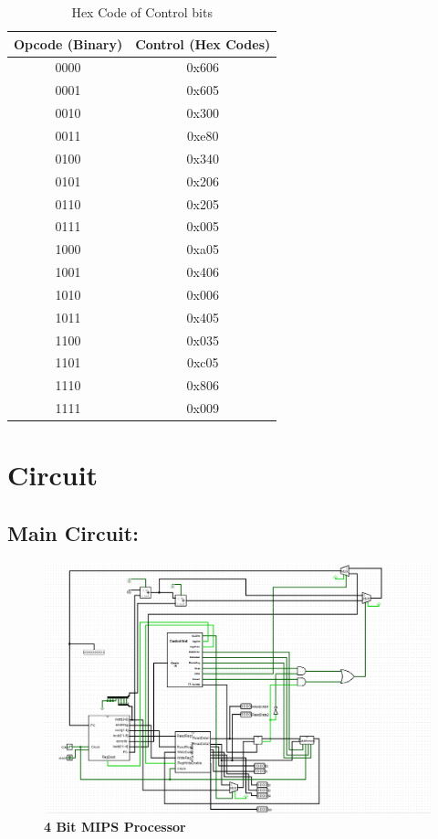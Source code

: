 \documentclass{article}
\begin{document}
\begin{table}[!h]
    \centering
    \begin{tabular}{|c|c|}
        \hline
        \textbf{Opcode (Binary)} & \textbf{Control (Hex Codes)} \\
        \hline
        0000 & 0x606 \\ \hline
        0001 & 0x605 \\ \hline
        0010 & 0x300 \\ \hline
        0011 & 0xe80 \\ \hline
        0100 & 0x340 \\ \hline
        0101 & 0x206 \\ \hline
        0110 & 0x205 \\ \hline
        0111 & 0x005 \\ \hline
        1000 & 0xa05 \\ \hline
        1001 & 0x406 \\ \hline
        1010 & 0x006 \\ \hline
        1011 & 0x405 \\ \hline
        1100 & 0x035 \\ \hline
        1101 & 0xc05 \\ \hline
        1110 & 0x806 \\ \hline
        1111 & 0x009 \\ \hline
    \end{tabular}
    \caption{Hex Code of Control bits}
    \label{tab:2}
\end{table}

\newpage

\section{Circuit}
\subsection{Main Circuit:}
    
    \begin{figure}[!h]
        \includegraphics[scale = 0.5]{Images/Main circuit.png}
        \caption{\textbf{4 Bit MIPS Processor}}
    \end{figure}
\end{document}
